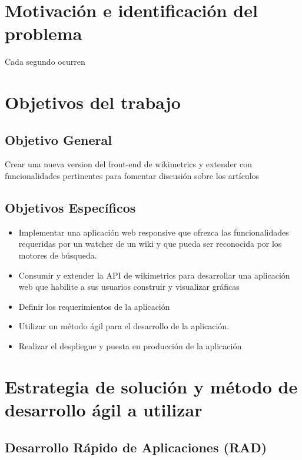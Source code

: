 

\section{Motivación e identificación del problema}

Cada segundo ocurren




\section{Objetivos del trabajo}


\subsection{Objetivo General}
Crear una nueva version del front-end de wikimetrics y extender con funcionalidades pertinentes para fomentar discusión sobre los artículos

\subsection{Objetivos Específicos}

\begin{itemize}
    \item Implementar una aplicación web responsive que ofrezca las funcionalidades requeridas por un watcher de un wiki y que pueda ser reconocida por los motores de búsqueda.
    \item Consumir y extender la API de wikimetrics para desarrollar una aplicación web que habilite a sus usuarios construir y visualizar gráficas
    \item Definir los requerimientos de la aplicación
    \item Utilizar un método ágil para el desarrollo de la aplicación.
    \item Realizar el despliegue y puesta en producción de la aplicación
\end{itemize}

\section{Estrategia de solución y método de desarrollo ágil a utilizar}

\subsection{Desarrollo Rápido de Aplicaciones (RAD)}

